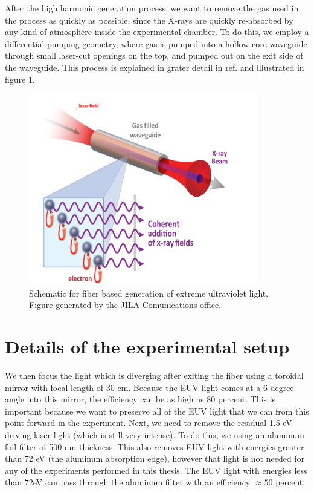 After the high harmonic generation process, we want to remove the gas used in the process as quickly as possible, since the X-rays are quickly re-absorbed by any kind of atmosphere inside the experimental chamber. To do this, we employ a differential pumping geometry, where gas is pumped into a hollow core waveguide through small laser-cut openings on the top, and pumped out on the exit side of the waveguide. This process is explained in grater detail in ref. \cite{Murnane2010} and illustrated in figure \ref{fig:Waveguide}.

\begin{figure}
	\begin{center}
		\includegraphics[width=100mm]{figs/HHGSchematic.png}
	\end{center}
	\caption{Schematic for fiber based generation of extreme ultraviolet light. Figure generated by the JILA Comunications office.}
	\label{fig:Waveguide}
\end{figure}

\section{Details of the experimental setup}

We then focus the light which is diverging after exiting the fiber using a toroidal mirror with focal length of 30 cm. Because the EUV light comes at a 6 degree angle into this mirror, the efficiency can be as high as 80 percent. This is important because we want to preserve all of the EUV light that we can from this point forward in the experiment. Next, we need to remove the residual 1.5 eV driving laser light (which is still very intense). To do this, we using an aluminum foil filter of 500 nm thickness. This also removes EUV light with energies greater than 72 eV (the aluminum absorption edge), however that light is not needed for any of the experiments performed in this thesis. The EUV light with energies less than 72eV can pass through the aluminum filter with an efficiency $\approx 50$ percent.

